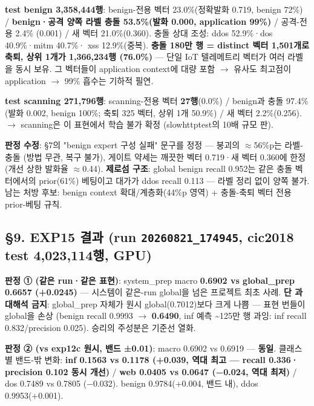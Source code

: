 \textbf{test benign 3,358,444행}: benign-전용 벡터 23.0\%(정확발화 0.719, benign 72\%) /\allowbreak{} \textbf{benign·공격 양쪽 라벨 충돌 53.5\%(발화 0.000, application 99\%)} /\allowbreak{} 공격-전용 2.4\% (0.001) /\allowbreak{} 새 벡터 21.0\%(0.360). 충돌 상대 조성: ddos 52.9\%·dos 40.9\%·mitm 40.7\%· xss 12.9\%(중복). \textbf{충돌 180만 행 =\allowbreak{} distinct 벡터 1,501개로 축퇴, 상위 1개가 1,366,234행 (76.0\%)} — 단일 IoT 텔레메트리 벡터가 여러 라벨을 동시 보유. 그 벡터들이 application context에 대량 포함  \ensuremath{\rightarrow}  유사도 최고점이 application  \ensuremath{\rightarrow}  99\% 흡수는 기하적 필연.

\textbf{test scanning 271,796행}: scanning-전용 벡터 \textbf{27행}(0.0\%) /\allowbreak{} benign과 충돌 97.4\% (발화 0.002, benign 100\%; 축퇴 325 벡터, 상위 1개 50.9\%) /\allowbreak{} 새 벡터 2.2\%(0.256).  \ensuremath{\rightarrow}  scanning은 이 표현에서 학습 불가 확정 (slowhttptest의 10배 규모 판).

\textbf{판정 수정}: §7의 "benign expert 구성 실패" 문구를 정정 — 붕괴의 \ensuremath{\approx}56\%p는 라벨-충돌 (방법 무관, 복구 불가), 게이트 약세는 깨끗한 벡터 0.719·새 벡터 0.360에 한정(개선 상한 발화율 \ensuremath{\approx}0.44). \textbf{제로섬 구조}: global benign recall 0.952는 같은 충돌 벡터에서의 prior(61\%) 베팅이고 대가가 ddos recall 0.113 — 라벨 정리 없이 양쪽 불가. 남는 처방 후보: benign context 확대/\allowbreak{}계층화(44\%p 영역) +\allowbreak{} 충돌-축퇴 벡터 전용 prior-베팅 규칙.

\subsection{§9. EXP15 결과 (run \texttt{20260821\allowbreak{}\_\allowbreak{}\allowbreak{}174945}, cic2018 test 4,023,114행, GPU)}
\textbf{판정 ① (같은 run·같은 표현)}: system\_\allowbreak{}prep macro \textbf{0.6902 vs global\_\allowbreak{}prep 0.6657 (+\allowbreak{}0.0245)} — 시스템이 같은-run global을 넘은 프로젝트 최초 사례. \textbf{단 과대해석 금지}: global\_\allowbreak{}prep 자체가 원시 global(0.7012)보다 크게 나쁨 — 표현 번들이 global을 손상 (benign recall 0.9993 \ensuremath{\rightarrow} \textbf{0.6490}, inf 예측 \textasciitilde{}125만 행 과잉: inf recall 0.832/\allowbreak{}precision 0.025). 승리의 주성분은 기준선 열화.

\textbf{판정 ② (vs exp12c 원시, 밴드 ±0.01)}: macro 0.6902 vs 0.6919 — \textbf{동일}. 클래스별 밴드-밖 변화: \textbf{inf 0.1563 vs 0.1178 (+\allowbreak{}0.039, 역대 최고 — recall 0.336· precision 0.102 동시 개선)} /\allowbreak{} \textbf{web 0.0405 vs 0.0647 (−0.024, 역대 최저)} /\allowbreak{} dos 0.7489 vs 0.7805 (−0.032). benign 0.9784(+\allowbreak{}0.004, 밴드 내), ddos 0.9953(+\allowbreak{}0.001).

